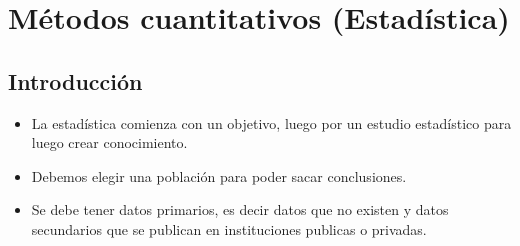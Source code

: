 \part{Métodos cuantitativos (Estadística)}

\chapter{Introducción}
\begin{itemize}
    \item La estadística comienza con un objetivo, luego por un estudio estadístico para luego crear conocimiento.
    \item Debemos elegir una población para poder sacar conclusiones.
    \item Se debe tener datos primarios, es decir datos que no existen y datos secundarios que se publican en instituciones publicas o privadas.
\end{itemize}

